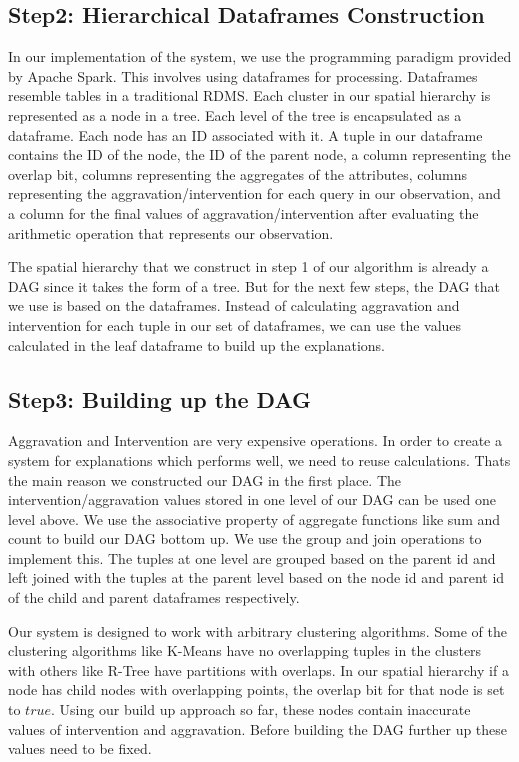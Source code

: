 \subsection{Step2: Hierarchical Dataframes Construction}
In our implementation of the system, we use the programming paradigm provided by Apache Spark. This involves using dataframes for processing. Dataframes resemble tables in a traditional RDMS. Each cluster in our spatial hierarchy is represented as a node in a tree. Each level of the tree is encapsulated as a dataframe. Each node has an ID associated with it. A tuple in our dataframe contains the ID of the node, the ID of the parent node, a column representing the overlap bit, columns representing the aggregates of the attributes, columns representing the aggravation/intervention for each query in our observation, and a column for the final values of aggravation/intervention after evaluating the arithmetic operation that represents our observation.

The spatial hierarchy that we construct in step 1 of our algorithm is already a DAG since it takes the form of a tree. But for the next few steps, the DAG that we use is based on the dataframes. Instead of calculating aggravation and intervention for each tuple in our set of dataframes, we can use the values calculated in the leaf dataframe to build up the explanations.

\subsection{Step3: Building up the DAG}
Aggravation and Intervention are very expensive operations. In order to create a system for explanations which performs well, we need to reuse calculations. Thats the main reason we constructed our DAG in the first place. The intervention/aggravation values stored in one level of our DAG can be used one level above. We use the associative property of aggregate functions like sum and count to build our DAG bottom up. We use the group and join operations to implement this. The tuples at one level are grouped based on the parent id and left joined with the tuples at the parent level based on the node id and parent id of the child and parent dataframes respectively.

Our system is designed to work with arbitrary clustering algorithms. Some of the clustering algorithms like K-Means have no overlapping tuples in the clusters with others like R-Tree have partitions with overlaps. In our spatial hierarchy if a node has child nodes with overlapping points, the overlap bit for that node is set to $true$. Using our build up approach so far, these nodes contain inaccurate values of intervention and aggravation. Before building the DAG further up these values need to be fixed.

